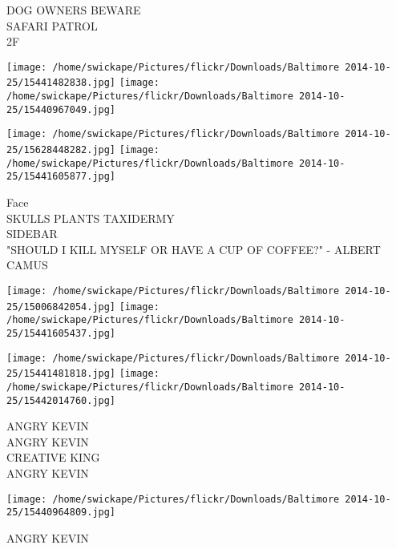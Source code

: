 \documentclass[10pt,letterpaper]{article}
\begin{document}
DOG OWNERS BEWARE\\
SAFARI PATROL\\
2F\\
\pagebreak

\texttt{[image: /home/swickape/Pictures/flickr/Downloads/Baltimore 2014-10-25/15441482838.jpg]}
\texttt{[image: /home/swickape/Pictures/flickr/Downloads/Baltimore 2014-10-25/15440967049.jpg]}

\texttt{[image: /home/swickape/Pictures/flickr/Downloads/Baltimore 2014-10-25/15628448282.jpg]}
\texttt{[image: /home/swickape/Pictures/flickr/Downloads/Baltimore 2014-10-25/15441605877.jpg]}

Face\\
SKULLS PLANTS TAXIDERMY\\
SIDEBAR\\
"SHOULD I KILL MYSELF OR HAVE A CUP OF COFFEE?" {-} ALBERT CAMUS\\
\pagebreak

\texttt{[image: /home/swickape/Pictures/flickr/Downloads/Baltimore 2014-10-25/15006842054.jpg]}
\texttt{[image: /home/swickape/Pictures/flickr/Downloads/Baltimore 2014-10-25/15441605437.jpg]}

\texttt{[image: /home/swickape/Pictures/flickr/Downloads/Baltimore 2014-10-25/15441481818.jpg]}
\texttt{[image: /home/swickape/Pictures/flickr/Downloads/Baltimore 2014-10-25/15442014760.jpg]}

ANGRY KEVIN\\
ANGRY KEVIN\\
CREATIVE KING\\
ANGRY KEVIN\\
\pagebreak

\texttt{[image: /home/swickape/Pictures/flickr/Downloads/Baltimore 2014-10-25/15440964809.jpg]}

ANGRY KEVIN\\
\pagebreak
\end{document}

